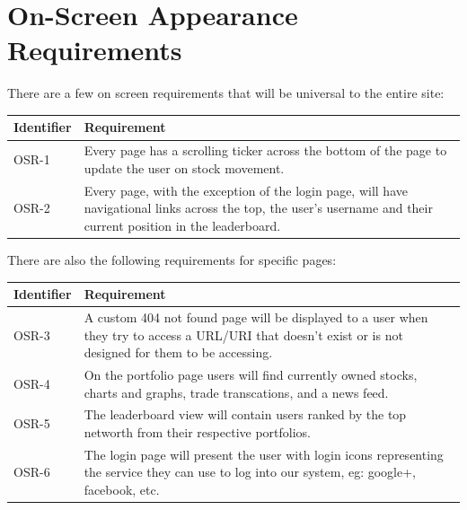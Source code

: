 \section{On-Screen Appearance Requirements}



There are a few on screen requirements that will be universal to the entire site:\\
\renewcommand\arraystretch{2}
\begin{longtable}{|p{0.6in}|p{4.6in}|}
\hline
{\large \color{color1}Identifier}&{\large \color{color1}Requirement} \\ \hline

OSR-1& Every page has a scrolling ticker across the bottom of the page to update the user
on stock movement. \\ \hline

OSR-2& Every page, with the exception of the login page, will have
navigational links across the top, the user's username and their current position in
the leaderboard. \\ \hline

\end{longtable}


There are also the following requirements for specific pages:\\

\renewcommand\arraystretch{2}
\begin{longtable}{|p{0.6in}|p{4.6in}|}
\hline
{\large \color{color1}Identifier}&{\large \color{color1}Requirement} \\ \hline

OSR-3&  A custom 404 not found page will be displayed to a user when they try to  access
a URL/URI that doesn't exist or is not designed for them to be accessing. \\ \hline

OSR-4& On the portfolio page users will find currently owned stocks, charts and graphs,
trade transcations, and a news feed. \\ \hline

OSR-5&  The leaderboard view will contain users ranked by the top networth from their
respective portfolios. \\ \hline

OSR-6&  The login page will present the user with login icons representing the service
they can use to log into our system, eg: google+, facebook, etc. \\ \hline

\end{longtable}


